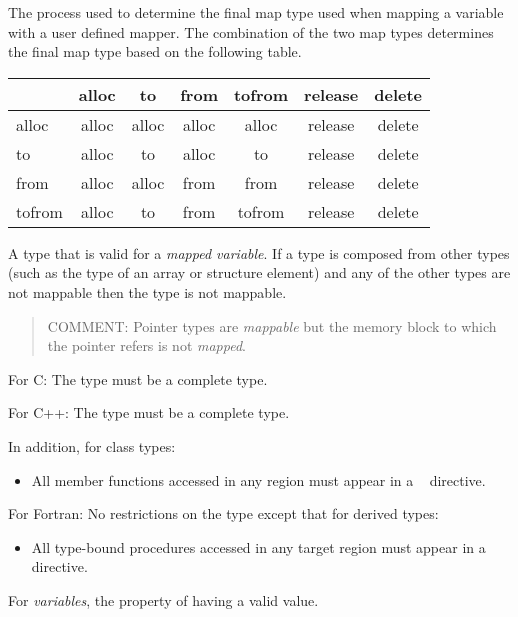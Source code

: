 \glossarydefstart
The process used to determine the final map type used when mapping a variable
with a user defined mapper.  The combination of the two map types determines the
final map type based on the following table.

\begin{tabular}{l|c|c|c|c|c|c}
  & alloc & to    & from  & tofrom & release & delete \\
  \hline
alloc  & alloc & alloc & alloc & alloc  & release & delete \\
to     & alloc & to    & alloc & to     & release & delete \\
from   & alloc & alloc & from  & from   & release & delete \\
tofrom & alloc & to    & from  & tofrom & release & delete \\
\end{tabular}
\glossarydefend

\glossarydefstart
A type that is valid for a \emph{mapped variable}. If a type is composed from other types 
(such as the type of an array or structure element) and any of the other types are 
not mappable then the type is not mappable.

\begin{quote}
COMMENT: Pointer types are \emph{mappable} but the memory block to which the pointer refers is not \emph{mapped}.
\end{quote}

For C: 
\nopagebreak
The type must be a complete type.

For C++: 
\nopagebreak
The type must be a complete type.

In addition, for class types:
\begin{itemize}
\item All member functions accessed in any  region must appear in a 
~ directive.
\end{itemize}

For Fortran: 
\nopagebreak
No restrictions on the type except that for derived types:

\begin{itemize}
\item All type-bound procedures accessed in any target region must appear in a ~ directive.
\end{itemize}
\glossarydefend

\glossarydefstart
For \emph{variables}, the property of having a valid value.

